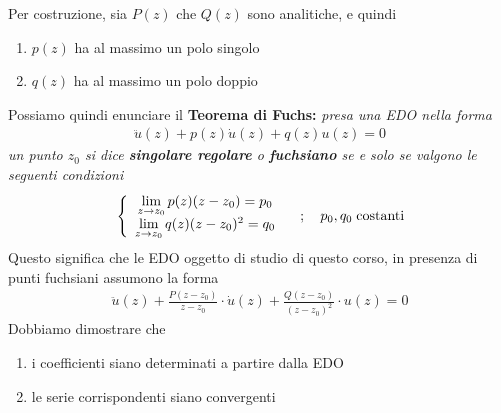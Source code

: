 \newpage

Per costruzione, sia $P(z)$ che $Q(z)$ sono analitiche, e quindi
\begin{enumerate}
	\item $p(z)$ ha al massimo un polo singolo
	\item $q(z)$ ha al massimo un polo doppio
\end{enumerate}

Possiamo quindi enunciare il \textbf{Teorema di Fuchs:} \textit{presa una EDO nella forma
\begin{align}
	\ddot{u}(z) + p(z)\dot{u}(z) + q(z)u(z) = 0
\end{align}
un punto $z_0$ si dice \textbf{singolare regolare} o \textbf{fuchsiano} se e solo se valgono le seguenti condizioni
\begin{align}
	\left\{ \begin{array}{cc} \underset{z \rightarrow z_0}{\lim} \, p(z)(z-z_0) = p_0\\ \underset{z \rightarrow z_0}{\lim} \, q(z)(z-z_0)^2 = q_0 \end{array} \right. \quad ; \quad p_0, q_0 \; \text{costanti}
\end{align}
}
Questo significa che le EDO oggetto di studio di questo corso, in presenza di punti fuchsiani assumono la forma
\begin{align}
	\ddot{u}(z) + \frac{P(z-z_0)}{z-z_0} \cdot \dot{u}(z) + \frac{Q(z-z_0)}{(z-z_0)^2} \cdot u(z) = 0
\end{align}
Dobbiamo dimostrare che
\begin{enumerate}
	\item i coefficienti siano determinati a partire dalla EDO 
	\item le serie corrispondenti siano convergenti
\end{enumerate}

